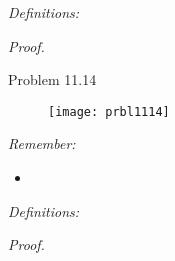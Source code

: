 \textit{Definitions:}


\textit{Proof.}

\clearpage



\Large{Problem 11.14}
\begin{figure}[H]
    \centering
    \texttt{[image: prbl1114]}
    \label{fig:prbl1114}
\end{figure}

\textit{Remember:}
\begin{itemize}
	\item 
\end{itemize}

\textit{Definitions:}


\textit{Proof.}

\clearpage













